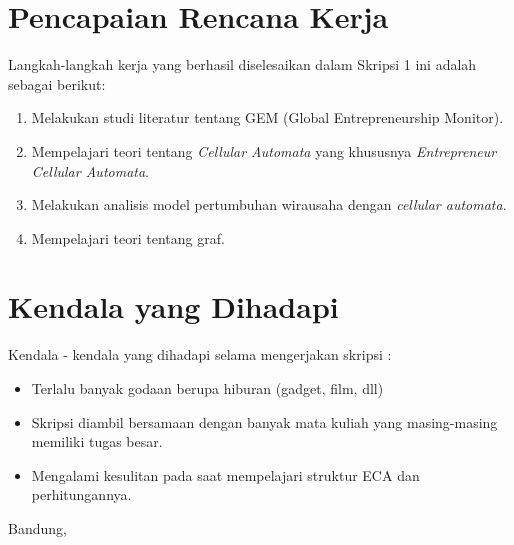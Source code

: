 \documentclass[a4paper,twoside]{article}
\begin{document}
\section{Pencapaian Rencana Kerja}
Langkah-langkah kerja yang berhasil diselesaikan dalam Skripsi 1 ini adalah sebagai berikut:
\begin{enumerate}
\item Melakukan studi literatur tentang GEM (Global Entrepreneurship Monitor).
\item Mempelajari teori tentang \textit{Cellular Automata} yang khususnya \textit{Entrepreneur Cellular Automata}.
\item Melakukan analisis model pertumbuhan wirausaha dengan \textit{cellular automata}.
\item Mempelajari teori tentang graf.
\end{enumerate}



\section{Kendala yang Dihadapi}
Kendala - kendala yang dihadapi selama mengerjakan skripsi :
\begin{itemize}
	\item Terlalu banyak godaan berupa hiburan (gadget, film, dll)
	\item Skripsi diambil bersamaan dengan banyak mata kuliah yang masing-masing memiliki tugas besar.
	\item Mengalami kesulitan pada saat mempelajari struktur ECA dan perhitungannya.
\end{itemize}

\vspace{1cm}
\centering Bandung, \tanggal\\
\vspace{2cm} \nama \\ 
\vspace{1cm}
\end{document}
